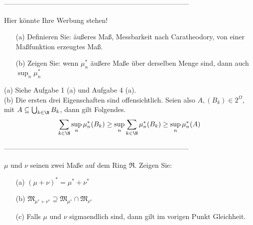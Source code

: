 --------------------------------------------------------------------------------

\begin{exercise}

Hier könnte Ihre Werbung stehen!

\begin{itemize}
  \item[(a)] Definieren Sie: äußeres Maß, Messbarkeit nach Caratheodory, von einer Maßfunktion erzeugtes Maß.
  \item[(b)] Zeigen Sie: wenn $\mu^\ast_n$ äußere Maße über derselben Menge sind, dann auch $\sup_n \mu^\ast_n$
\end{itemize}

\end{exercise}

\begin{solution}

(a) Siehe Aufgabe 1 (a) und Aufgabe 4 (a). \\

(b) Die ersten drei Eigenschaften sind offensichtlich. Seien also $A, (B_k) \in 2^\Omega$, mit $A \subseteq \bigcup_{k \in \N} B_k$, dann gilt Folgendes.
\begin{align*}
  \sum_{k \in \N} \sup_n \mu^\ast_n(B_k)
  \geq
  \sup_n \sum_{k \in \N} \mu^\ast_n(B_k)
  \geq
  \sup_n \mu^\ast_n(A)
\end{align*}

\end{solution}

--------------------------------------------------------------------------------

\begin{exercise}

$\mu$ und $\nu$ seinen zwei Maße auf dem Ring $\mathfrak{R}$. Zeigen Sie:

\begin{itemize}
  \item[(a)] $(\mu + \nu)^\ast = \mu^\ast + \nu^\ast$
  \item[(b)] $\mathfrak{M}_{\mu^\ast + \nu^\ast} \supseteq \mathfrak{M}_{\mu^\ast} \cap \mathfrak{M}_{\nu^\ast}$
  \item[(c)] Falls $\mu$ und $\nu$ sigmaendlich sind, dann gilt im vorigen Punkt Gleichheit.
\end{itemize}

\end{exercise}

